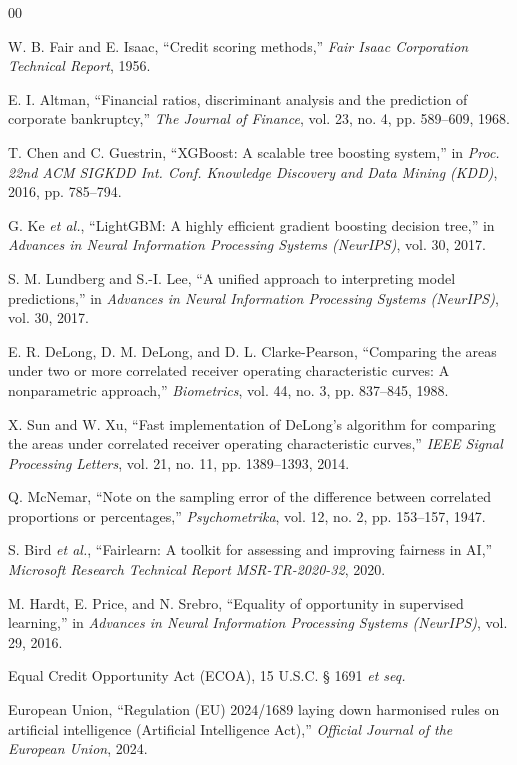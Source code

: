 \documentclass[journal]{IEEEtran}
\begin{document}
\begin{thebibliography}{00}

 W. B. Fair and E. Isaac, ``Credit scoring methods,'' \textit{Fair Isaac Corporation Technical Report}, 1956.

 E. I. Altman, ``Financial ratios, discriminant analysis and the prediction of corporate bankruptcy,'' \textit{The Journal of Finance}, vol. 23, no. 4, pp. 589--609, 1968.

 T. Chen and C. Guestrin, ``XGBoost: A scalable tree boosting system,'' in \textit{Proc. 22nd ACM SIGKDD Int. Conf. Knowledge Discovery and Data Mining (KDD)}, 2016, pp. 785--794.

 G. Ke \emph{et al.}, ``LightGBM: A highly efficient gradient boosting decision tree,'' in \textit{Advances in Neural Information Processing Systems (NeurIPS)}, vol. 30, 2017.

 S. M. Lundberg and S.-I. Lee, ``A unified approach to interpreting model predictions,'' in \textit{Advances in Neural Information Processing Systems (NeurIPS)}, vol. 30, 2017.

 E. R. DeLong, D. M. DeLong, and D. L. Clarke-Pearson, ``Comparing the areas under two or more correlated receiver operating characteristic curves: A nonparametric approach,'' \textit{Biometrics}, vol. 44, no. 3, pp. 837--845, 1988.

 X. Sun and W. Xu, ``Fast implementation of DeLong's algorithm for comparing the areas under correlated receiver operating characteristic curves,'' \textit{IEEE Signal Processing Letters}, vol. 21, no. 11, pp. 1389--1393, 2014.

 Q. McNemar, ``Note on the sampling error of the difference between correlated proportions or percentages,'' \textit{Psychometrika}, vol. 12, no. 2, pp. 153--157, 1947.

 S. Bird \emph{et al.}, ``Fairlearn: A toolkit for assessing and improving fairness in AI,'' \textit{Microsoft Research Technical Report MSR-TR-2020-32}, 2020.

 M. Hardt, E. Price, and N. Srebro, ``Equality of opportunity in supervised learning,'' in \textit{Advances in Neural Information Processing Systems (NeurIPS)}, vol. 29, 2016.

 Equal Credit Opportunity Act (ECOA), 15 U.S.C. § 1691 \textit{et seq.}

 European Union, ``Regulation (EU) 2024/1689 laying down harmonised rules on artificial intelligence (Artificial Intelligence Act),'' \textit{Official Journal of the European Union}, 2024.


\end{thebibliography}
\end{document}
